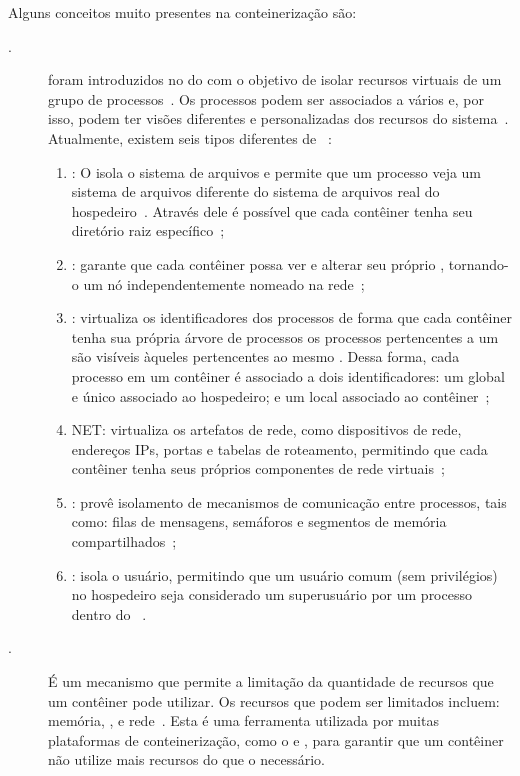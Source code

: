Alguns conceitos muito presentes na conteinerização são:
\begin{description}
    \item[\namespace.] \Namespaces foram introduzidos no  do \linux com o objetivo de isolar recursos virtuais de um grupo de processos~\cite{gao2017containerleaks}. Os processos podem ser associados a vários \namespaces e, por isso, podem ter visões diferentes e personalizadas dos recursos do sistema~\cite{watada2019emerging}. Atualmente, existem seis tipos diferentes de \namespaces~\cite{watada2019emerging}:
    \begin{enumerate}[label=(\roman*)]
        \item \mount: O \mount \namespace isola o sistema de arquivos e permite que um processo veja um sistema de arquivos diferente do sistema de arquivos real do hospedeiro~\cite{watada2019emerging}. Através dele é possível que cada contêiner tenha seu diretório raiz específico~\cite{dua2014virtualization};
        \item \uts: garante que cada contêiner possa ver e alterar seu próprio \hostname, tornando-o um nó independentemente nomeado na rede~\cite{watada2019emerging, dua2014virtualization};
        \item \pid: virtualiza os identificadores dos processos de forma que cada contêiner tenha sua própria árvore de processos \ie os processos pertencentes a um \namespace são visíveis àqueles pertencentes ao mesmo \namespace. Dessa forma, cada processo em um contêiner é associado a dois identificadores: um global e único associado ao hospedeiro; e um local associado ao contêiner~\cite{watada2019emerging};
        \item NET: virtualiza os artefatos de rede, como dispositivos de rede, endereços IPs, portas e tabelas de roteamento, permitindo que cada contêiner tenha seus próprios componentes de rede virtuais~\cite{watada2019emerging, dua2014virtualization};
        \item \ipc: provê isolamento de mecanismos de comunicação entre processos, tais como: filas de mensagens, semáforos e segmentos de memória compartilhados~\cite{watada2019emerging, dua2014virtualization};
        \item \user: isola o usuário, permitindo que um usuário comum (sem privilégios) no hospedeiro seja considerado um superusuário por um processo dentro do \namespace~\cite{watada2019emerging}.
    \end{enumerate}
    \item[\cgroups.] É um mecanismo que permite a limitação da quantidade de recursos que um contêiner pode utilizar. Os recursos que podem ser limitados incluem: memória, \cpu, \io e rede~\cite{watada2019emerging}. Esta é uma ferramenta utilizada por muitas plataformas de conteinerização, como o \docker e \lxc, para garantir que um contêiner não utilize mais recursos do que o necessário.
\end{description}

